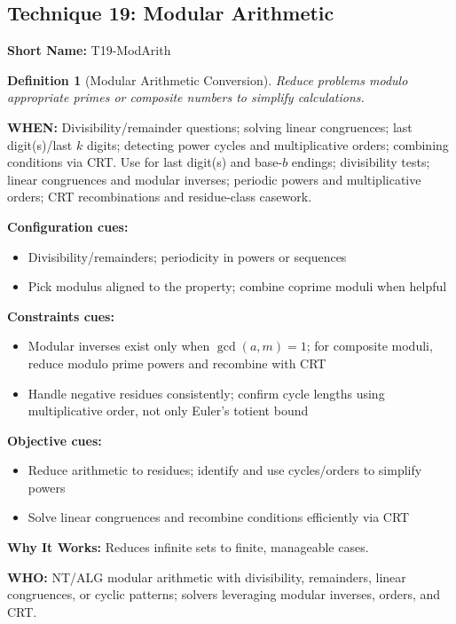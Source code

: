 \documentclass[12pt]{article}
\newtheorem{definition}{Definition}[section]
\begin{document}
\subsection{Technique 19: Modular Arithmetic}
\textbf{Short Name:} T19-ModArith

\begin{definition}[Modular Arithmetic Conversion]
Reduce problems modulo appropriate primes or composite numbers to simplify calculations.
\end{definition}

\textbf{WHEN:} Divisibility/remainder questions; solving linear congruences; last digit(s)/last $k$ digits; detecting power cycles and multiplicative orders; combining conditions via CRT. Use for last digit(s) and base-$b$ endings; divisibility tests; linear congruences and modular inverses; periodic powers and multiplicative orders; CRT recombinations and residue-class casework.

\textbf{Configuration cues:}
\begin{itemize}
    \item Divisibility/remainders; periodicity in powers or sequences
    \item Pick modulus aligned to the property; combine coprime moduli when helpful
\end{itemize}

\textbf{Constraints cues:}
\begin{itemize}
    \item Modular inverses exist only when $\gcd(a,m)=1$; for composite moduli, reduce modulo prime powers and recombine with CRT
    \item Handle negative residues consistently; confirm cycle lengths using multiplicative order, not only Euler's totient bound
\end{itemize}

\textbf{Objective cues:}
\begin{itemize}
    \item Reduce arithmetic to residues; identify and use cycles/orders to simplify powers
    \item Solve linear congruences and recombine conditions efficiently via CRT
\end{itemize}

\textbf{Why It Works:} Reduces infinite sets to finite, manageable cases.

\textbf{WHO:} NT/ALG modular arithmetic with divisibility, remainders, linear congruences, or cyclic patterns; solvers leveraging modular inverses, orders, and CRT.
\end{document}
